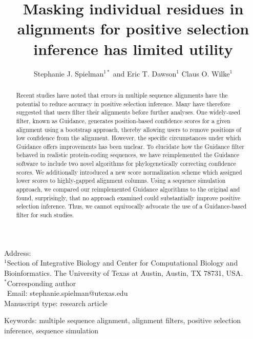 \documentclass[10pt]{article}
\begin{document}
\title{\textbf{Masking individual residues in alignments for positive selection inference has limited utility}}
\author{Stephanie J. Spielman$^{1*}$ and Eric T. Dawson$^{1}$ Claus O. Wilke$^{1}$}
\date{}

\maketitle
\noindent
Address:\\
$^1$Section of Integrative Biology and Center for Computational Biology and Bioinformatics. The University
of Texas at Austin, Austin, TX 78731, USA.\\

\bigskip
\noindent
$^*$Corresponding author\\
$\phantom{^*}$Email: stephanie.spielman@utexas.edu\\

\bigskip
\noindent
Manuscript type: research article

\bigskip
\noindent Keywords: multiple sequence alignment, alignment filters, positive selection inference, sequence simulation

\newpage
\begin{abstract}
 Recent studies have noted that errors in multiple sequence alignments have the potential to reduce accuracy in positive selection inference. Many have therefore suggested that users filter their alignments before further analyses. One widely-used filter, known as Guidance, generates position-based confidence scores for a given alignment using a bootstrap approach, thereby allowing users to remove positions of low confidence from the alignment. However, the specific circumstances under which Guidance offers improvements has been unclear. To elucidate how the Guidance filter behaved in realistic protein-coding sequences, we have reimplemented the Guidance software to include two novel algorithms for phylogenetically correcting confidence scores. We additionally introduced a new score normalization scheme which assigned lower scores to highly-gapped alignment columns. Using a sequence simulation approach, we compared our reimplemented Guidance algorithms to the original and found, surprisingly, that no approach examined could substantially improve positive selection inference. Thus, we cannot equivocally advocate the use of a Guidance-based filter for such studies.
\end{abstract}
\end{document}
